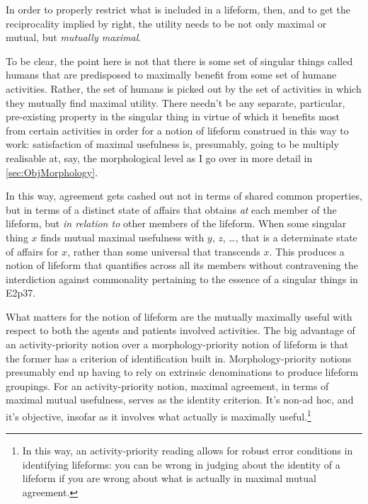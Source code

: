 \documentclass{article}
\newcommand{\dash}{\unskip{—}}
\begin{document}
In order to properly restrict what is included in a lifeform, then, and to get the reciprocality implied by  right, the utility needs to be not only maximal or mutual, but \emph{mutually maximal}.

To be clear, the point here is not that there is some set of singular things called humans that are predisposed to maximally benefit from some set of humane activities. Rather, the set of humans is picked out by the set of activities in which they mutually find maximal utility. There needn't be any separate, particular, pre-existing property in the singular thing in virtue of which it benefits most from certain activities in order for a notion of lifeform construed in this way to work: satisfaction of maximal usefulness is, presumably, going to be multiply realisable at, say, the morphological level \dash as I go over in more detail in \cref{sec:ObjMorphology}.

In this way, agreement gets cashed out not in terms of shared common properties, but in terms of a distinct state of affairs that obtains \emph{at} each member of the lifeform, but \emph{in relation to} other members of the lifeform. When some singular thing $x$ finds mutual maximal usefulness with $y$, $z$, \dots{}, that is a determinate state of affairs for $x$, rather than some universal that transcends $x$. This produces a notion of lifeform that quantifies across all its members without contravening the interdiction against commonality pertaining to the essence of a singular things in E2p37.

What matters for the notion of lifeform are the mutually maximally useful \dash with respect to both the agents and patients involved \dash activities. The big advantage of an activity-priority notion over a morphology-priority notion of lifeform is that the former has a criterion of identification built in. Morphology-priority notions presumably end up having to rely on extrinsic denominations to produce lifeform groupings. For an activity-priority notion, maximal agreement, in terms of maximal mutual usefulness, serves as the identity criterion. It's non-ad hoc, and it's objective, insofar as it involves what actually is maximally useful.\footnote{In this way, an activity-priority reading allows for robust error conditions in identifying lifeforms: you can be wrong in judging about the identity of a lifeform if you are wrong about what is actually in maximal mutual agreement.}
\end{document}
